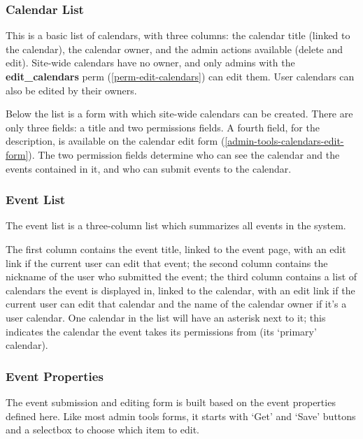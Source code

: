 \subsubsection{Calendar List}

This is a basic list of calendars, with three columns: the calendar title (linked to the calendar), the calendar owner, and the admin actions available (delete and edit). Site-wide calendars have no owner, and only admins with the {\bf edit\_calendars} perm (\ref{perm-edit-calendars}) can edit them. User calendars can also be edited by their owners.

Below the list is a form with which site-wide calendars can be created. There are only three fields: a title and two permissions fields. A fourth field, for the description, is available on the calendar edit form (\ref{admin-tools-calendars-edit-form}). The two permission fields determine who can see the calendar and the events contained in it, and who can submit events to the calendar.

\subsubsection{Event List}
\label{admin-tools-calendars-event-list}

The event list is a three-column list which summarizes all events in the system.

The first column contains the event title, linked to the event page, with an edit link if the current user can edit that event; the second column contains the nickname of the user who submitted the event; the third column contains a list of calendars the event is displayed in, linked to the calendar, with an edit link if the current user can edit that calendar and the name of the calendar owner if it's a user calendar. One calendar in the list will have an asterisk next to it; this indicates the calendar the event takes its permissions from (its `primary' calendar).

\subsubsection{Event Properties}
\label{admin-tools-calendars-event-properties}

The event submission and editing form is built based on the event properties defined here. Like most admin tools forms, it starts with `Get' and `Save' buttons and a selectbox to choose which item to edit.


